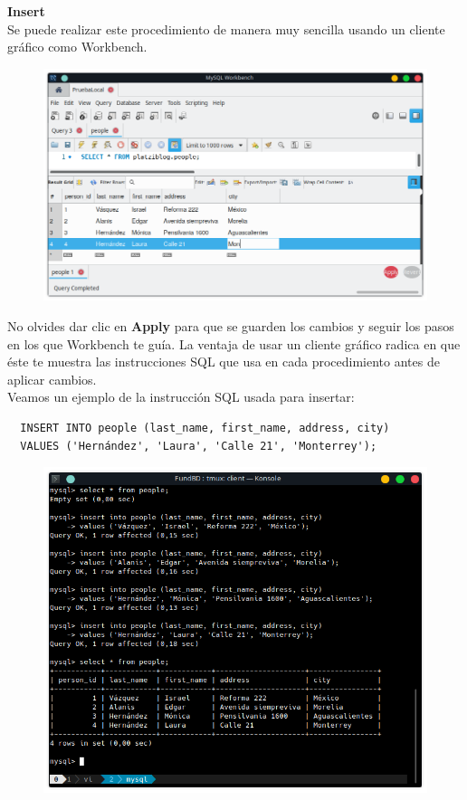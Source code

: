 \documentclass{article}
\begin{document}
\vspace{0.4cm}
\textbf{Insert}\\
Se puede realizar este procedimiento de manera muy sencilla usando un cliente gráfico como Workbench.\\
\begin{figure}[h!]
  \centering
  \includegraphics[scale=0.75]{./Pictures/149_dml_insert_workbench.png}
\end{figure}

No olvides dar clic en \textbf{Apply} para que se guarden los cambios y seguir
los pasos en los que Workbench te guía. La ventaja de usar un cliente gráfico
radica en que éste te muestra las instrucciones SQL que usa en cada
procedimiento antes de aplicar cambios.\\

Veamos un ejemplo de la instrucción SQL usada para insertar:
\begin{verbatim}
  INSERT INTO people (last_name, first_name, address, city)
  VALUES ('Hernández', 'Laura', 'Calle 21', 'Monterrey');
\end{verbatim}

\newpage

\begin{figure}[h!]
  \centering
  \includegraphics[scale=0.75]{./Pictures/150_dml_insert_console.png}
\end{figure}
\end{document}
